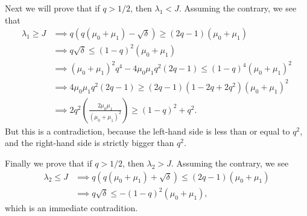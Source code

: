 \documentclass[12pt]{article}
\begin{document}
Next we will prove that if $q>1/2$, then $\lambda_1<J$.
Assuming the contrary, we see that
\begin{align*}
\lambda_1\geq J 
&\implies q(q(\mu_0+\mu_1)-\sqrt{\delta})\geq (2q-1)(\mu_0+\mu_1)\\
&\implies q\sqrt{\delta} \leq (1-q)^2 (\mu_0+\mu_1)\\
&\implies (\mu_0+\mu_1)^2 q^4 - 4\mu_0\mu_1 q^2(2q-1) \leq  (1-q)^4
(\mu_0+\mu_1)^2\\
&\implies 4\mu_0\mu_1 q^2(2q-1) \geq (2q-1)(1-2q+2q^2)(\mu_0+\mu_1)^2\\
&\implies 2q^2
\left( \frac{2\mu_0\mu_1}{(\mu_0+\mu_1)^2}\right)\geq (1-q)^2 + q^2.
\end{align*}
But this is a contradiction, because
the left-hand side is less than or equal to $q^2$,
and the right-hand side is strictly bigger than $q^2$.

Finally we prove that if $q>1/2$, then $\lambda_2>J$.
Assuming the contrary, we see
\begin{align*}
\lambda_2\leq J 
&\implies q(q(\mu_0+\mu_1)+\sqrt{\delta})\leq (2q-1)(\mu_0+\mu_1)\\
&\implies q\sqrt{\delta} \leq -(1-q)^2 (\mu_0+\mu_1),
\end{align*}
which is an immediate contradition.


%
\end{document}
